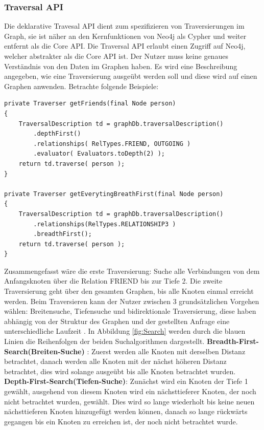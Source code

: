 \subsubsection{Traversal API}
Die deklarative Travesal API dient zum spezifizieren von Traversierungen im Graph, sie ist näher an den Kernfunktionen von Neo4j als Cypher und weiter entfernt als die Core API. Die Traversal API erlaubt einen Zugriff auf Neo4j, welcher  abstrakter als die Core API ist. Der Nutzer muss keine genaues Verständnis von den Daten im Graphen haben. Es wird eine Beschreibung angegeben, wie eine Traversierung  ausgeübt werden soll und diese wird auf einen Graphen anwenden. Betrachte folgende Beispiele:
\begin{Verbatim}[frame=single]
private Traverser getFriends(final Node person)
{
	TraversalDescription td = graphDb.traversalDescription()
		.depthFirst()
		.relationships( RelTypes.FRIEND, OUTGOING )
		.evaluator( Evaluators.toDepth(2) );
	return td.traverse( person );
}

private Traverser getEverytingBreathFirst(final Node person)
{
	TraversalDescription td = graphDb.traversalDescription()
		.relationships(RelTypes.RELATIONSHIP3 )
		.breadthFirst();
	return td.traverse( person );
}
\end{Verbatim}
Zusammengefasst wäre die erste Traversierung: Suche alle Verbindungen von dem Anfangsknoten über die Relation FRIEND bis zur Tiefe 2. Die zweite Traversierung geht über den gesamten Graphen, bis alle Knoten einmal erreicht werden. Beim Traversieren kann der  Nutzer zwischen 3 grundsätzlichen Vorgehen wählen: Breitensuche, Tiefensuche und bidirektionale Traversierung, diese haben abhängig von der Struktur des Graphen und der gestellten Anfrage eine unterschiedliche Laufzeit \parencite{vukotic2015neo4j}. In  Abbildung \ref{fig:Search} werden durch die blauen Linien die Reihenfolgen der beiden Suchalgorithmen dargestellt. \newline
\textbf {Breadth-First-Search(Breiten-Suche)} : Zuerst werden alle Knoten mit derselben Distanz betrachtet, danach werden alle Knoten mit der nächst höheren Distanz betrachtet, dies wird solange ausgeübt bis alle Knoten betrachtet wurden. \newline
\textbf {Depth-First-Search(Tiefen-Suche)}: Zunächst wird ein Knoten der Tiefe 1 gewählt, ausgehend von diesem Knoten wird ein nächsttieferer Knoten, der noch nicht betrachtet wurden, gewählt. Dies wird so lange wiederholt bis keine neuen nächsttieferen Knoten hinzugefügt werden können, danach so lange rückwärts gegangen bis ein Knoten zu erreichen ist, der noch nicht betrachtet wurde. \newline

